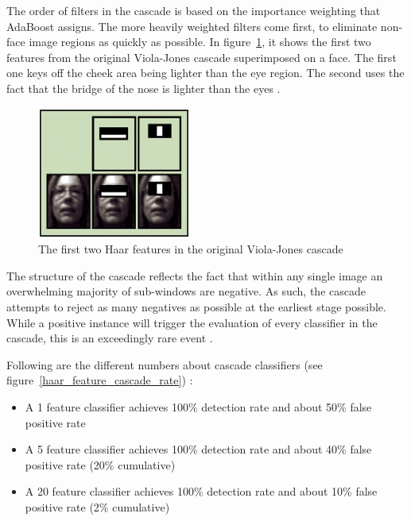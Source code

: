 \noindent The order of filters in the cascade is based on the importance weighting that AdaBoost assigns. The more heavily weighted filters come first, to eliminate non-face image regions as quickly as possible. In figure~\ref{haar_feature_first_2_features}, it shows the first two features from the original Viola-Jones cascade superimposed on a face. The first one keys off the cheek area being lighter than the eye region. The second uses the fact that the bridge of the nose is lighter than the eyes \cite{HEW07}.
\newline

\begin{figure}[!h]
\begin{center}
\noindent \includegraphics[scale=1]{figures/haar_feature_first_2_features} 
\newline
\caption{The first two Haar features in the original Viola-Jones cascade}
\label{haar_feature_first_2_features}
\end{center} 
\end{figure}

\noindent The structure of the cascade reflects the fact that within any single image an overwhelming majority of sub-windows are negative. As such, the cascade attempts to reject as many negatives as possible at the earliest stage possible. While a positive instance will trigger the evaluation of every classifier in the cascade, this is an exceedingly rare event \cite{VIO01}.
\newline

\noindent Following are the different numbers about cascade classifiers (see figure~\ref{haar_feature_cascade_rate}) \cite{UBC01}:

\begin{itemize}
  \item A 1 feature classifier achieves 100\% detection rate and about 50\% false positive rate
  \item A 5 feature classifier achieves 100\% detection rate and about 40\% false positive rate (20\% cumulative)
  \item A 20 feature classifier achieves 100\% detection rate and about 10\% false positive rate (2\% cumulative)
\end{itemize}

